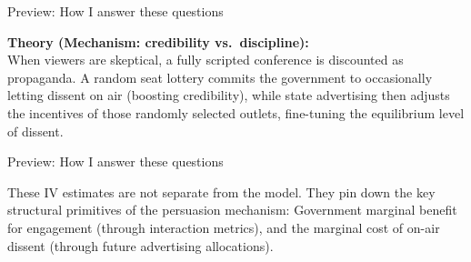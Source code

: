 \documentclass[10pt,aspectratio=169]{beamer}
\begin{document}
\begin{frame}{Preview: How I answer these questions}
\hypertarget{preview}{}

\textbf{Theory (Mechanism: credibility vs.\ discipline):}\\
When viewers are skeptical, a fully scripted conference is discounted as propaganda. 
A random seat lottery commits the government to occasionally letting dissent on air (boosting credibility), 
while state advertising then adjusts the incentives of those randomly selected outlets, fine-tuning the equilibrium level of dissent.
\hfill\hyperlink{appmodel}{}
\end{frame}

\begin{frame}{Preview: How I answer these questions}
\centering
{}

\vspace{0.5cm}

These IV estimates are not separate from the model. They pin down the key structural primitives of the persuasion mechanism: Government marginal benefit for engagement (through interaction metrics), and the marginal cost of on-air dissent (through future advertising allocations).

\end{frame}
\end{document}
